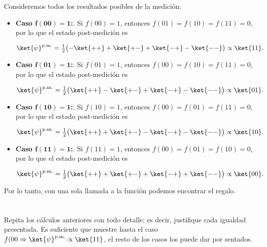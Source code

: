 \documentclass[./../main.tex]{subfiles}
\begin{document}
Consideremos todos los resultados posibles de la medición:

\begin{itemize}
	\item \textbf{Caso \(\bm{f(00) = 1}\):}. Si \(f(00) = 1\), entonces \(f(01) = f(10) = f(11) = 0\), por lo que el estado post-medición es

	      \begin{equation*}
		      \ket{\psi}^{\text{p.m.}} = \tfrac{1}{2}\bigl(-\ket{++} + \ket{+-} + \ket{-+} - \ket{--}\bigr) \propto \ket{11}.
	      \end{equation*}


	\item \textbf{Caso \(\bm{f(01) = 1}\):}. Si \(f(01) = 1\), entonces \(f(00) = f(10) = f(11) = 0\), por lo que el estado post-medición es

	      \begin{equation*}
		      \ket{\psi}^{\text{p.m.}} = \tfrac{1}{2}\bigl(\ket{++} - \ket{+-} + \ket{-+} - \ket{--}\bigr) \propto \ket{01}.
	      \end{equation*}

	\item \textbf{Caso \(\bm{f(10) = 1}\):}. Si \(f(10) = 1\), entonces \(f(00) = f(01) = f(11) = 0\), por lo que el estado post-medición es

	      \begin{equation*}
		      \ket{\psi}^{\text{p.m.}} = \tfrac{1}{2}\bigl(\ket{++} + \ket{+-} - \ket{-+} - \ket{--}\bigr) \propto \ket{10}.
	      \end{equation*}

	\item \textbf{Caso \(\bm{f(11) = 1}\):}. Si \(f(11) = 1\), entonces \(f(00) = f(01) = f(10) = 0\), por lo que el estado post-medición es

	      \begin{equation*}
		      \ket{\psi}^{\text{p.m.}} = \tfrac{1}{2}\bigl(\ket{++} + \ket{+-} + \ket{-+} + \ket{--}\bigr) \propto \ket{00}.
	      \end{equation*}
\end{itemize}

Por lo tanto, con una sola llamada a la función podemos encontrar el regalo.
\section{}

Repita los cálculos anteriores con todo detalle; es decir, justifique cada igualdad presentada. Es suficiente que muestre hasta el caso \(f(00  \Rightarrow \ket{\psi}^{\text{p.m.}} \propto \ket{11}\), el resto de los casos los puede dar por sentados.
\end{document}
